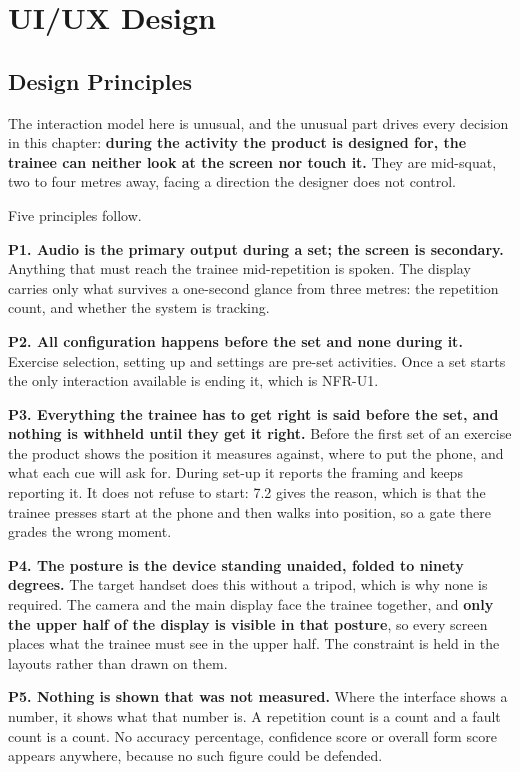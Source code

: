 \chapter{UI/UX Design}
\label{chap:8}

\section{Design Principles}
\label{sec:8.1}

The interaction model here is unusual, and the unusual part drives every decision in this chapter: \textbf{during the activity the product is designed for, the trainee can neither look at the screen nor touch it.} They are mid-squat, two to four metres away, facing a direction the designer does not control.

Five principles follow.

\textbf{P1. Audio is the primary output during a set; the screen is secondary.} Anything that must reach the trainee mid-repetition is spoken. The display carries only what survives a one-second glance from three metres: the repetition count, and whether the system is tracking.

\textbf{P2. All configuration happens before the set and none during it.} Exercise selection, setting up and settings are pre-set activities. Once a set starts the only interaction available is ending it, which is NFR-U1.

\textbf{P3. Everything the trainee has to get right is said before the set, and nothing is withheld until they get it right.} Before the first set of an exercise the product shows the position it measures against, where to put the phone, and what each cue will ask for. During set-up it reports the framing and keeps reporting it. It does not refuse to start: 7.2 gives the reason, which is that the trainee presses start at the phone and then walks into position, so a gate there grades the wrong moment.

\textbf{P4. The posture is the device standing unaided, folded to ninety degrees.} The target handset does this without a tripod, which is why none is required. The camera and the main display face the trainee together, and \textbf{only the upper half of the display is visible in that posture}, so every screen places what the trainee must see in the upper half. The constraint is held in the layouts rather than drawn on them.

\textbf{P5. Nothing is shown that was not measured.} Where the interface shows a number, it shows what that number is. A repetition count is a count and a fault count is a count. No accuracy percentage, confidence score or overall form score appears anywhere, because no such figure could be defended.

